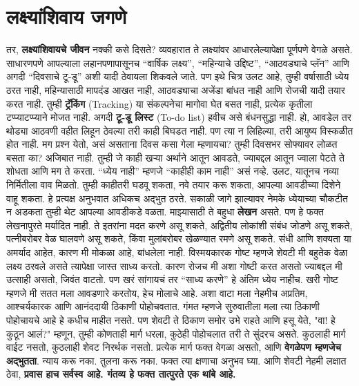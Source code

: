  \section*{लक्ष्यांशिवाय जगणे}
तर, \textbf{लक्ष्यांशिवायचे जीवन} नक्की कसे दिसते? व्यवहारात ते लक्ष्यांवर आधारलेल्यापेक्षा पूर्णपणे वेगळे असते. साधारणपणे आपल्याला लहानपणापासूनच “वार्षिक लक्ष्य”, “महिन्याचे उद्दिष्ट”, “आठवड्याचे प्लॅन” आणि अगदी “दिवसाचे टू-डू” अशी यादी ठेवायला शिकवले जाते. पण इथे चित्र उलट आहे, तुम्ही वर्षासाठी ध्येय ठरत नाही, महिन्यासाठी मापदंड आखत नाही, आठवड्याचा अजेंडा बांधत नाही आणि रोजची यादी तयार करत नाही.
तुम्ही \textbf{ट्रॅकिंग} \hspace{0.2cm}(Tracking) या संकल्पनेचा मागोवा घेत बसत नाही, प्रत्येक कृतीला टप्प्याटप्प्याने मोजत नाही. अगदी \textbf{टू-डू लिस्ट} \hspace{0.2cm}(To-do list) हवीच असे बंधनसुद्धा नाही. हो, आवडेल तर थोड्या आठवणी वहीत लिहून ठेवल्या तरी काही बिघडत नाही. पण त्या न लिहिल्या, तरी आयुष्य विस्कळीत होत नाही.
मग प्रश्न येतो, असं असताना दिवस कसा गेला म्हणायचा? तुम्ही दिवसभर सोफ्यावर लोळत बसता का? अजिबात नाही. तुम्ही जे काही खऱ्या अर्थाने आतून आवडते, ज्याबद्दल आतून ज्वाला पेटते ते शोधता आणि मग ते करता. “ध्येय नाही” म्हणजे “काहीही काम नाही” असं नव्हे. उलट, यातूनच नव्या निर्मितीला वाव मिळतो. तुम्ही काहीतरी घडवू शकता, नवे तयार करू शकता, आपल्या आवडीच्या दिशेने वाहू शकता.
हे प्रत्यक्ष अनुभवात अधिकच अद्भुत ठरते. सकाळी जागे झाल्यावर नेमके ध्येयाच्या चौकटीत न अडकता तुम्ही थेट आपल्या आवडीकडे वळता. माझ्यासाठी ते बहुधा \textbf{लेखन} असते. पण हे फक्त लेखनापुरते मर्यादित नाही. ते इतरांना मदत करणे असू शकते, अद्वितीय लोकांशी संबंध जोडणे असू शकते, पत्नीबरोबर वेळ घालवणे असू शकते, किंवा मुलांबरोबर खेळण्यात रमणे असू शकते. संधी आणि शक्यता या अमर्याद आहेत, कारण मी मोकळा आहे, बांधलेला नाही.
विस्मयकारक गोष्ट म्हणजे शेवटी मी बहुतेक वेळा लक्ष्य ठरवले असते त्यापेक्षा जास्त साध्य करतो. कारण रोजच मी अशा गोष्टी करत असतो ज्याबद्दल मी उत्साही असतो, जिवंत वाटतो. पण खरं सांगायचं तर “साध्य करणे” हे अंतिम ध्येय नाहीच. खरी गोष्ट म्हणजे मी सतत मला आवडणारे करतोय, हेच मोलाचे आहे.
अशा वाटा मला नेहमीच अप्रतिम, आश्चर्यकारक आणि आनंददायी ठिकाणी पोहोचवतात. गंमत म्हणजे सुरुवातीला मला त्या ठिकाणी पोहोचायचे आहे हे कधीच माहीत नसते. पण शेवटी ते ठिकाण समोर उभे राहते आणि हसू येते, "वा! हे कुठून आलं?"
म्हणून, तुम्ही कोणताही मार्ग धरला, कुठेही पोहोचलात तरी ते सुंदरच असते. कुठलाही मार्ग वाईट नसतो, कुठलाही शेवट निरर्थक नसतो. प्रत्येक मार्ग फक्त वेगळा असतो, आणि \textbf{वेगळेपण म्हणजेच अद्भुतता}.
न्याय करू नका. तुलना करू नका. फक्त त्या क्षणाचा अनुभव घ्या.
आणि शेवटी नेहमी लक्षात ठेवा, \textbf{प्रवास हाच सर्वस्व आहे. गंतव्य हे फक्त तात्पुरते एक थांबे आहे.}

